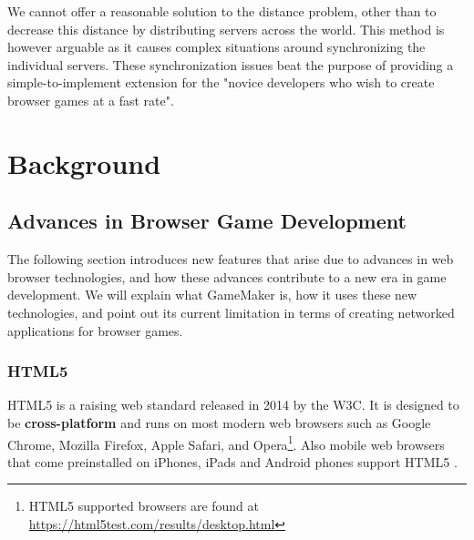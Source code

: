\documentclass[bsc, 12pt, twoside, singlespacing, parskip, abbrevs, notimes, normalheadings, logo]{styles/infthesis}
\begin{document}
\vspace{1em}
We cannot offer a reasonable solution to the distance problem, other than to decrease this distance by distributing servers across the world. This method is however arguable as it causes complex situations around synchronizing the individual servers. These synchronization issues beat the purpose of providing a simple-to-implement extension for the "novice developers who wish to create browser games at a fast rate".



\chapter{Background}

\section{Advances in Browser Game Development}
The following section introduces new features that arise due to advances in web browser technologies, and how these advances contribute to a new era in game development. We will explain what GameMaker is, how it uses these new technologies, and point out its current limitation in terms of creating networked applications for browser games.

\subsection{HTML5}
HTML5 is a raising web standard released in 2014 by the W3C. It is designed to be \textbf{cross-platform} and runs on most modern web browsers such as Google Chrome, Mozilla Firefox, Apple Safari, and Opera\footnote{HTML5 supported browsers are found at \url{https://html5test.com/results/desktop.html}}. Also mobile web browsers that come preinstalled on iPhones, iPads and Android phones support HTML5 \cite{Pro_HTML5_Programming}.
\end{document}
